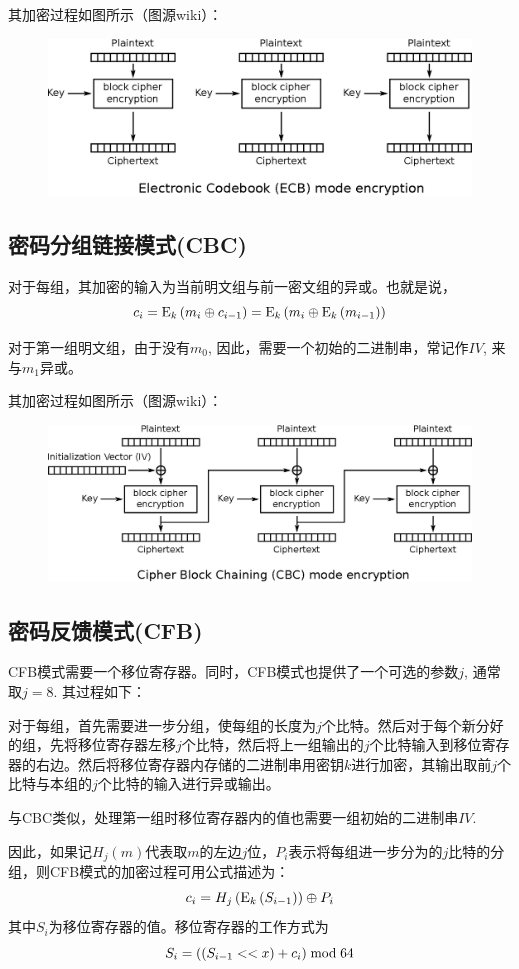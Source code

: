 其加密过程如图所示（图源wiki）：
\begin{figure}[H]
\centering
\includegraphics[scale=1]{ECB.eps}
\end{figure}
\subsection{密码分组链接模式(CBC)}
对于每组，其加密的输入为当前明文组与前一密文组的异或。也就是说，
\begin{equation}
c_i={\mathrm{E}_{k}\left({m_i\oplus c_{i-1}}\right)}={\mathrm{E}_{k}\left({m_i\oplus {\mathrm{E}_{k}\left({m_{i-1}}\right)}}\right)}
\end{equation}

对于第一组明文组，由于没有$m_0$, 因此，需要一个初始的二进制串，常记作$IV$, 来与$m_1$异或。\par
其加密过程如图所示（图源wiki）：
\begin{figure}[H]
\centering
\includegraphics[scale=1]{CBC.eps}
\end{figure}
\subsection{密码反馈模式(CFB)}
CFB模式需要一个移位寄存器。同时，CFB模式也提供了一个可选的参数$j$, 通常取$j=8$. 其过程如下：\par
对于每组，首先需要进一步分组，使每组的长度为$j$个比特。然后对于每个新分好的组，先将移位寄存器左移$j$个比特，然后将上一组输出的$j$个比特输入到移位寄存器的右边。然后将移位寄存器内存储的二进制串用密钥$k$进行加密，其输出取前$j$个比特与本组的$j$个比特的输入进行异或输出。\par
与CBC类似，处理第一组时移位寄存器内的值也需要一组初始的二进制串$IV$.\par
因此，如果记$H_j(m)$代表取$m$的左边$j$位，$P_i$表示将每组进一步分为的$j$比特的分组，则CFB模式的加密过程可用公式描述为：
\begin{equation}
c_i=H_j\left( {{\mathrm{E}_{k}\left({S_{i-1}}\right)}}\right)\oplus P_i
\end{equation}
其中$S_i$为移位寄存器的值。移位寄存器的工作方式为
\begin{equation}
S_i=\left( {\left( {S_{i-1} << x}\right)+c_i}\right)\bmod{64}
\end{equation}

